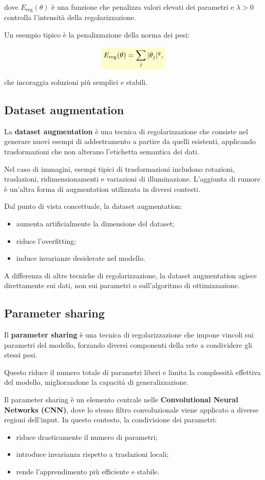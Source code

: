 \documentclass[a4paper,12pt]{report}
\newcommand{\highlight}[1]{%
\colorbox{yellow!20}{$\displaystyle #1$}%
}
\begin{document}
dove $E_{\text{reg}}(\theta)$ è una funzione che penalizza valori elevati dei parametri e $\lambda > 0$ controlla l’intensità della regolarizzazione.

Un esempio tipico è la penalizzazione della norma dei pesi:

\[
\highlight{
E_{\text{reg}}(\theta) = \sum_j |\theta_j|^q,}
\]

che incoraggia soluzioni più semplici e stabili.

\subsection{Dataset augmentation}

La \textbf{dataset augmentation} è una tecnica di regolarizzazione che consiste nel generare nuovi esempi di addestramento a partire da quelli esistenti, applicando trasformazioni che non alterano l’etichetta semantica dei dati.

Nel caso di immagini, esempi tipici di trasformazioni includono rotazioni, traslazioni, ridimensionamenti e variazioni di illuminazione.  
L’aggiunta di rumore è un’altra forma di augmentation utilizzata in diversi contesti.

Dal punto di vista concettuale, la dataset augmentation:
\begin{itemize}
    \item aumenta artificialmente la dimensione del dataset;
    \item riduce l’overfitting;
    \item induce invarianze desiderate nel modello.
\end{itemize}

A differenza di altre tecniche di regolarizzazione, la dataset augmentation agisce direttamente sui dati, non sui parametri o sull’algoritmo di ottimizzazione.

\subsection{Parameter sharing}

Il \textbf{parameter sharing} è una tecnica di regolarizzazione che impone vincoli sui parametri del modello, forzando diversi componenti della rete a condividere gli stessi pesi.

Questo riduce il numero totale di parametri liberi e limita la complessità effettiva del modello, migliorandone la capacità di generalizzazione.

Il parameter sharing è un elemento centrale nelle \textbf{Convolutional Neural Networks (CNN)}, dove lo stesso filtro convoluzionale viene applicato a diverse regioni dell’input.  
In questo contesto, la condivisione dei parametri:
\begin{itemize}
    \item riduce drasticamente il numero di parametri;
    \item introduce invarianza rispetto a traslazioni locali;
    \item rende l’apprendimento più efficiente e stabile.
\end{itemize}
\end{document}
